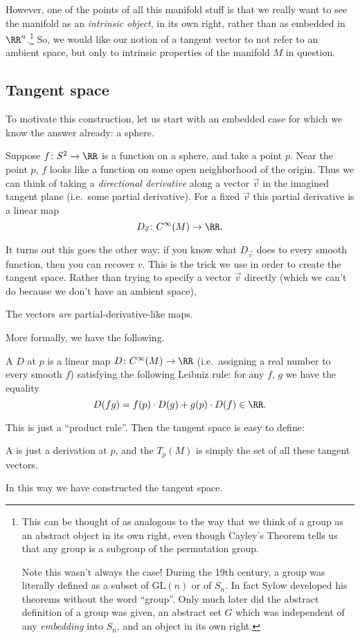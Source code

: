 However, one of the points of all this manifold stuff
is that we really want to see the manifold
as an \emph{intrinsic object}, in its own right,
rather than as embedded in $\RR^n$.\footnote{This
	can be thought of as analogous to the way
	that we think of a group as an abstract object in its own right,
	even though Cayley's Theorem tells us that any group is a subgroup
	of the permutation group.

	Note this wasn't always the case!
	During the 19th century, a group was literally defined
	as a subset of $\text{GL}(n)$ or of $S_n$.
	In fact Sylow developed his theorems without the word ``group''.
	Only much later did the abstract definition of a group was given,
	an abstract set $G$ which was independent of any \emph{embedding} into $S_n$,
	and an object in its own right.}
So, we would like our notion of a tangent vector to not refer to an ambient space,
but only to intrinsic properties of the manifold $M$ in question.

\subsection{Tangent space}
To motivate this construction, let us start
with an embedded case for which we know the answer already:
a sphere.

Suppose $f \colon S^2 \to \RR$ is a
function on a sphere, and take a point $p$.
Near the point $p$, $f$ looks like a function
on some open neighborhood of the origin.
Thus we can think of taking a \emph{directional derivative}
along a vector $\vec v$ in the imagined tangent plane
(i.e.\ some partial derivative).
For a fixed $\vec v$ this partial derivative is a linear map
\[ D_{\vec v} \colon C^\infty(M) \to \RR. \]

It turns out this goes the other way:
if you know what $D_{\vec v}$ does to every smooth function,
then you can recover $v$.
This is the trick we use in order to create the tangent space.
Rather than trying to specify a vector $\vec v$ directly
(which we can't do because we don't have an ambient space),
\begin{moral}
	The vectors \emph{are} partial-derivative-like maps.
\end{moral}
More formally, we have the following.
\begin{definition}
	A  $D$ at $p$ is a linear map
	$D \colon C^\infty(M) \to \RR$
	(i.e.\ assigning a real number to every smooth $f$)
	satisfying the following Leibniz rule:
	for any $f$, $g$ we have the equality
	\[ D(fg) = f(p) \cdot D(g) + g(p) \cdot D(f) \in \RR. \]
\end{definition}
This is just a ``product rule''.
Then the tangent space is easy to define:
\begin{definition}
	A  is just a derivation at $p$, and
	the  $T_p(M)$ is simply
	the set of all these tangent vectors.
\end{definition}
In this way we have constructed the tangent space.

